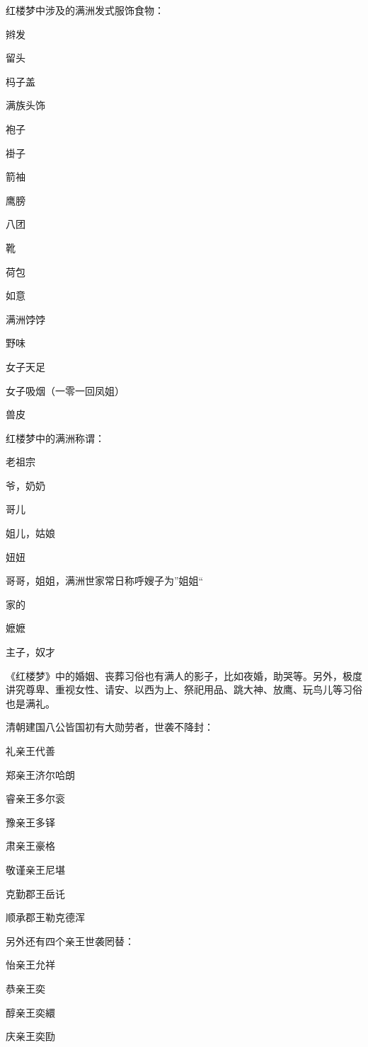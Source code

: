 红楼梦中涉及的满洲发式服饰食物：
\begin{itemize*}
	\item 辫发
	\item 留头
	\item 杩子盖
	\item 满族头饰
	\item 袍子
	\item 褂子
	\item 箭袖
	\item 鹰膀
	\item 八团
	\item 靴
	\item 荷包
	\item 如意
	\item 满洲饽饽
	\item 野味
	\item 女子天足
	\item 女子吸烟（一零一回凤姐）
	\item 兽皮
\end{itemize*}
红楼梦中的满洲称谓：
\begin{itemize*}
	\item 老祖宗
	\item 爷，奶奶
	\item 哥儿
	\item 姐儿，姑娘
	\item 妞妞
	\item 哥哥，姐姐，满洲世家常日称呼嫂子为”姐姐“
	\item 家的
	\item 嬷嬷
	\item 主子，奴才
\end{itemize*}
《红楼梦》中的婚姻、丧葬习俗也有满人的影子，比如夜婚，助哭等。另外，极度讲究尊卑、重视女性、请安、以西为上、祭祀用品、跳大神、放鹰、玩鸟儿等习俗也是满礼。

清朝建国八公皆国初有大勋劳者，世袭不降封：
\begin{itemize*}
	\item 礼亲王代善
	\item 郑亲王济尔哈朗
	\item 睿亲王多尔衮
	\item 豫亲王多铎
	\item 肃亲王豪格
	\item 敬谨亲王尼堪
	\item 克勤郡王岳讬
	\item 顺承郡王勒克德浑 
\end{itemize*}
	另外还有四个亲王世袭罔替：
\begin{itemize*}
	\item 怡亲王允祥
	\item 恭亲王奕
	\item 醇亲王奕繯
	\item 庆亲王奕劻
\end{itemize*}

